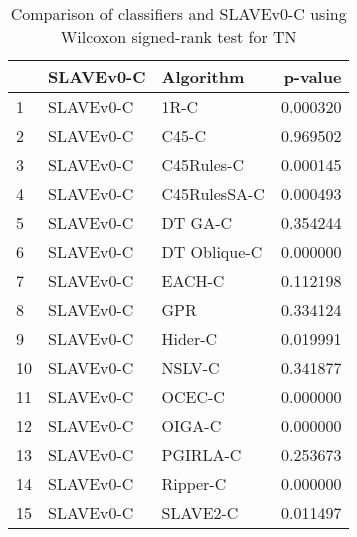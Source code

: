 \begin{table}
\footnotesize
\caption{Comparison of classifiers and SLAVEv0-C using Wilcoxon signed-rank test for TN}
\label{tab:SLAVEv0-C wilcoxon TN comparison}
\begin{tabular}{lllr}
\hline
 & SLAVEv0-C & Algorithm & p-value \\
\hline
1 & SLAVEv0-C & 1R-C & 0.000320 \\
2 & SLAVEv0-C & C45-C & 0.969502 \\
3 & SLAVEv0-C & C45Rules-C & 0.000145 \\
4 & SLAVEv0-C & C45RulesSA-C & 0.000493 \\
5 & SLAVEv0-C & DT GA-C & 0.354244 \\
6 & SLAVEv0-C & DT Oblique-C & 0.000000 \\
7 & SLAVEv0-C & EACH-C & 0.112198 \\
8 & SLAVEv0-C & GPR & 0.334124 \\
9 & SLAVEv0-C & Hider-C & 0.019991 \\
10 & SLAVEv0-C & NSLV-C & 0.341877 \\
11 & SLAVEv0-C & OCEC-C & 0.000000 \\
12 & SLAVEv0-C & OIGA-C & 0.000000 \\
13 & SLAVEv0-C & PGIRLA-C & 0.253673 \\
14 & SLAVEv0-C & Ripper-C & 0.000000 \\
15 & SLAVEv0-C & SLAVE2-C & 0.011497 \\
\hline
\end{tabular}
\end{table}
